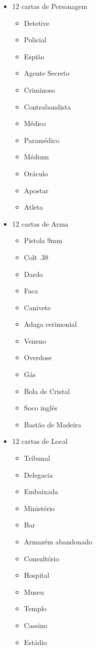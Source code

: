 \documentclass[a4paper, 11pt]{article}
\begin{document}
	\begin{itemize}

	\item 12 cartas de Personagem
		\begin{itemize}

		\item Detetive
		\item Policial
		\item Espião
		\item Agente Secreto
		\item Criminoso
		\item Contrabandista
		\item Médico
		\item Paramédico
		\item Médium
		\item Oráculo
		\item Apostar
		\item Atleta

		\end{itemize}
		
	\item 12 cartas de Arma
		\begin{itemize}

		\item Pistola 9mm
		\item Colt .38
		\item Dardo
		\item Faca
		\item Canivete
		\item Adaga cerimonial
		\item Veneno
		\item Overdose
		\item Gás
		\item Bola de Cristal
		\item Soco inglês
		\item Bastão de Madeira	

		\end{itemize}

	\item 12 cartas de Local
		\begin{itemize}

		\item Tribunal
		\item Delegacia
		\item Embaixada
		\item Ministério
		\item Bar
		\item Armazém abandonado
		\item Consultório
		\item Hospital
		\item Museu
		\item Templo
		\item Cassino
		\item Estádio


\end{itemize}
\end{itemize}
\end{document}
